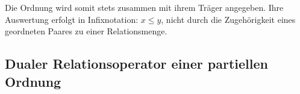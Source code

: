 \documentclass[main.tex]{subfiles}
\begin{document}
Die Ordnung wird somit stets zusammen mit ihrem Träger angegeben. Ihre
Auswertung erfolgt in Infixnotation: \(x\leq y\), nicht durch die
Zugehörigkeit eines geordneten Paares zu einer Relationsmenge.

\subsection{Dualer Relationsoperator einer partiellen Ordnung}

\end{document}
